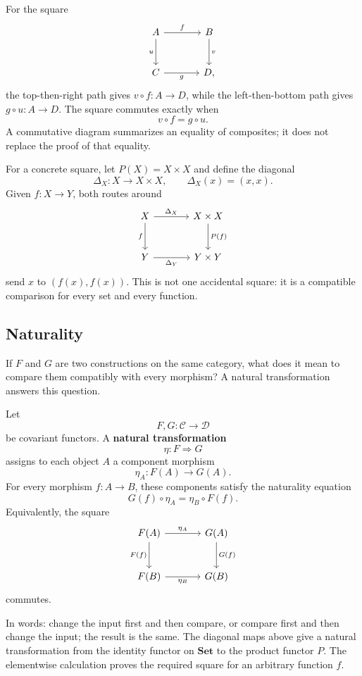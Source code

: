 For the square
\[
\begin{tikzcd}[column sep=large,row sep=large]
A \arrow[r,"f"] \arrow[d,"u"'] & B \arrow[d,"v"]\\
C \arrow[r,"g"'] & D,
\end{tikzcd}
\]
the top-then-right path gives $v\circ f:A\to D$, while the left-then-bottom
path gives $g\circ u:A\to D$. The square commutes exactly when
\[
v\circ f=g\circ u.
\]
A commutative diagram summarizes an equality of composites; it does not
replace the proof of that equality.

For a concrete square, let $P(X)=X\times X$ and define the diagonal
\[
\Delta_X:X\longrightarrow X\times X,
\qquad
\Delta_X(x)=(x,x).
\]
Given $f:X\to Y$, both routes around
\[
\begin{tikzcd}[column sep=large,row sep=large]
X \arrow[r,"\Delta_X"] \arrow[d,"f"'] & X\times X \arrow[d,"P(f)"]\\
Y \arrow[r,"\Delta_Y"'] & Y\times Y
\end{tikzcd}
\]
send $x$ to $(f(x),f(x))$. This is not one accidental square: it is a
compatible comparison for every set and every function.

\subsection{Naturality}
If $F$ and $G$ are two constructions on the same category, what does it mean
to compare them compatibly with every morphism? A natural transformation
answers this question.

\begin{definition}\label{def:natural-transformation}
Let
\[
F,G:\mathcal C\longrightarrow\mathcal D
\]
be covariant functors. A \textbf{natural transformation}
\[
\eta:F\Rightarrow G
\]
assigns to each object $A$ a component morphism
\[
\eta_A:F(A)\longrightarrow G(A).
\]
For every morphism $f:A\to B$, these components satisfy the naturality
equation
\[
\boxed{G(f)\circ\eta_A=\eta_B\circ F(f).}
\]
Equivalently, the square
\[
\begin{tikzcd}[column sep=large,row sep=large]
F(A) \arrow[r,"\eta_A"] \arrow[d,"F(f)"'] &
G(A) \arrow[d,"G(f)"]\\
F(B) \arrow[r,"\eta_B"'] & G(B)
\end{tikzcd}
\]
commutes.
\end{definition}

In words: change the input first and then compare, or compare first and then
change the input; the result is the same. The diagonal maps above give a
natural transformation from the identity functor on $\mathbf{Set}$ to the
product functor $P$. The elementwise calculation proves the required square
for an arbitrary function $f$.

